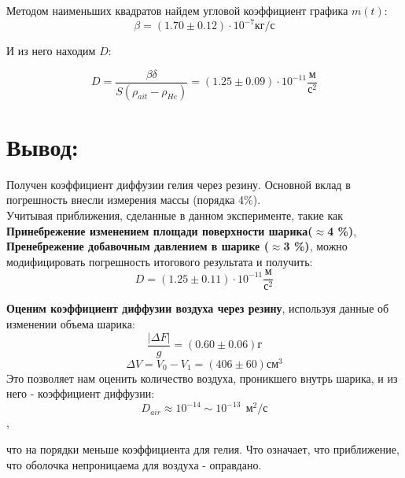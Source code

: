 Методом наименьших квадратов найдем угловой коэффициент графика $m(t)$:
\[\beta = (1.70 \pm 0.12) \cdot 10^{-7} кг/с\]

И из него находим $D$:

\[D = \frac{\beta \delta}{S(\rho_{ait} - \rho_{He})} = (1.25 \pm 0.09) \cdot 10^{-11}\frac{м}{с^2}\]

\section{Вывод:}

Получен коэффициент диффузии гелия через резину. Основной вклад в погрешность внесли измерения массы (порядка 4\%).\\

Учитывая приближения, сделанные в данном эксперименте, такие как \textbf{Принебрежение изменением площади поверхности шарика($\approx$4 \%)}, \textbf{Пренебрежение добавочным давлением в шарике ($\approx$3 \%)}, можно модифицировать погрешность итогового результата и получить:
\[D = (1.25 \pm 0.11)\cdot 10^{-11}\frac{м}{с^2}\] 

\textbf{Оценим коэффициент диффузии воздуха через резину}, используя данные об изменении объема шарика:
\[\frac{|\Delta F|}{g} = (0.60 \pm 0.06)г\]
\[\Delta V = V_0 - V_1 = (406 \pm 60 )см^3 \]
Это позволяет нам оценить количество воздуха, проникшего внутрь шарика, и из него - коэффициент диффузии:
\[D_{air} \approx 10^{-14} \sim 10^{-13} \:\:м^2/с\],

что на порядки меньше коэффициента для гелия. Что означает, что приближение, что оболочка непроницаема для воздуха - оправдано.





